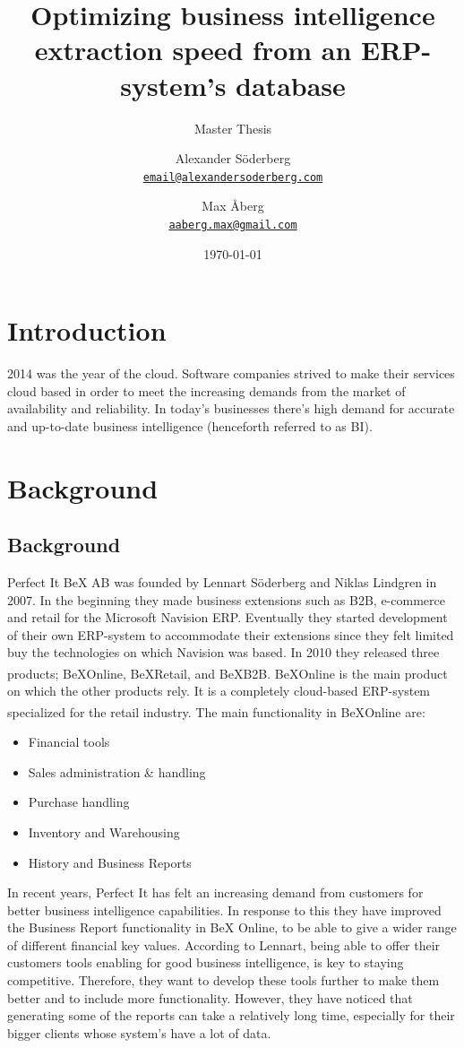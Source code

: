 \documentclass{cslthse-msc}
\author{
	Alexander Söderberg \\
	{\normalsize \href{mailto:email@alexandersoderberg.com}{\texttt{email@alexandersoderberg.com}}}
	\and
	Max Åberg \\
    {\normalsize \href{mailto:aaberg.max@gmail.com}{\texttt{aaberg.max@gmail.com}}}
}
\title{Optimizing business intelligence
extraction speed from an
ERP-system’s database}
\subtitle{Master Thesis}
\date{\today}
\newcommand{\bex}{BeX\textsuperscript{\textregistered}}
\begin{document}
\makefrontmatter

\chapter[Introduction]{Introduction}
2014 was the year of the cloud. Software companies strived to make their services cloud based in order to meet the increasing demands from the market of availability and reliability. 	
In today's businesses there's high demand for accurate and up-to-date business intelligence (henceforth referred to as BI). 

\chapter{Background}\label{sec:background}

\section{Background}
Perfect It BeX AB was founded by Lennart Söderberg and Niklas Lindgren in 2007. In the beginning they made business extensions such as B2B, e-commerce and retail for the Microsoft Navision ERP. Eventually they started development of their own ERP-system to accommodate their extensions since they felt limited buy the technologies on which Navision was based. In 2010 they released three products; \bex Online, \bex Retail, and \bex B2B. \bex Online is the main product on which the other products rely. It is a completely cloud-based ERP-system specialized for the retail industry. The main functionality in \bex Online are:

\begin{itemize}
\item Financial tools
\item Sales administration \& handling
\item Purchase handling
\item Inventory and Warehousing
\item History and Business Reports
\end{itemize}

In recent years, Perfect It has felt an increasing demand from customers for better business intelligence capabilities. In response to this they have improved the Business Report functionality in BeX Online, to be able to give a wider range of different financial key values. According to Lennart, being able to offer their customers tools enabling for good business intelligence, is key to staying competitive. Therefore, they want to develop these tools further to make them better and to include more functionality. However, they have noticed that generating some of the reports can take a relatively long time, especially for their bigger clients whose system's have a lot of data.
\end{document}

